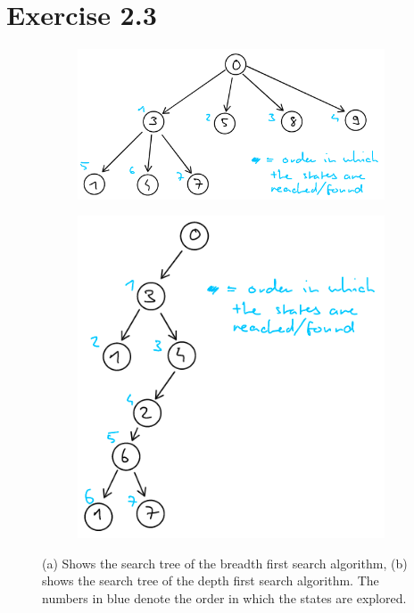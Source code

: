 \documentclass[12pt]{article}
\begin{document}
\section*{Exercise 2.3}


\begin{figure}[h!]
    \begin{subfigure}{0.5\textwidth}
        \centering
        \includegraphics[width=\textwidth]{sheet02_3a.png}
        \caption{}
    \end{subfigure}
    \begin{subfigure}{0.5\textwidth}
        \centering
        \includegraphics[width=\textwidth]{sheet02_3b.png}
        \caption{}
    \end{subfigure}
    \caption{(a) Shows the search tree of the breadth first search algorithm, (b) shows the search tree of the depth first search algorithm. The numbers in blue denote the order in which the states are explored.}
\end{figure}
\end{document}
